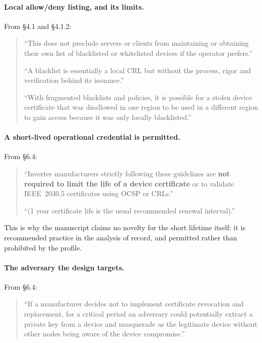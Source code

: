 \documentclass[review]{elsarticle}
\begin{document}
\paragraph{Local allow/deny listing, and its limits.} From \S4.1 and \S4.1.2:

\begin{quote}
``This does not preclude servers or clients from maintaining or obtaining their own list of
blacklisted or whitelisted devices if the operator prefers.''

``A blacklist is essentially a local CRL but without the process, rigor and verification behind
its issuance.''

``With fragmented blacklists and policies, it is possible for a stolen device certificate that was
disallowed in one region to be used in a different region to gain access because it was only
locally blacklisted.''
\end{quote}

\paragraph{A short-lived operational credential is permitted.} From \S6.4:

\begin{quote}
``Inverter manufacturers strictly following these guidelines are \textbf{not required to limit the
life of a device certificate} or to validate IEEE~2030.5 certificates using OCSP or CRLs.''

``(1 year certificate life is the usual recommended renewal interval).''
\end{quote}

This is why the manuscript claims no novelty for the short lifetime itself: it is recommended
practice in the analysis of record, and permitted rather than prohibited by the profile.

\paragraph{The adversary the design targets.} From \S6.4:

\begin{quote}
``If a manufacturer decides not to implement certificate revocation and replacement, for a
critical period an adversary could potentially extract a private key from a device and masquerade
as the legitimate device without other nodes being aware of the device compromise.''
\end{quote}
\end{document}
